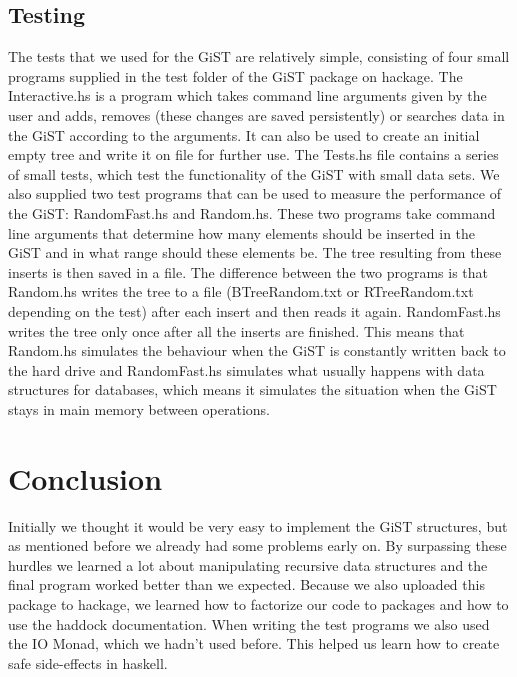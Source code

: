 \documentclass{scrartcl}
\begin{document}
\subsection{Testing}
The tests that we used for the GiST are relatively simple, consisting of four small programs supplied in the test folder of the GiST package on hackage. The Interactive.hs is a program which takes command line arguments
given by the user and adds, removes (these changes are saved persistently) or searches data in the GiST according to the arguments. It can also be used to create an initial empty tree and write it on file for further use.
The Tests.hs file contains a series of small tests, which test the functionality of the GiST with small data sets. We also supplied two test programs that can be used to measure the performance of the GiST: RandomFast.hs 
and Random.hs. These two programs take command line arguments that determine how many elements should be inserted in the GiST and in what range should these elements be. The tree resulting from these inserts is then
saved in a file. The difference between the two programs is that Random.hs writes the tree to a file (BTreeRandom.txt or RTreeRandom.txt depending on the test) after each insert and then reads it again. RandomFast.hs 
writes the tree only once after all the inserts are finished. This means that Random.hs simulates the behaviour when the GiST is constantly written back to the hard drive and RandomFast.hs simulates what usually happens 
with data structures for databases, which means it simulates the situation when the GiST stays in main memory between operations.

\section{Conclusion}

Initially we thought it would be very easy to implement the GiST structures, but as mentioned before we already had some problems early on. By surpassing 
these hurdles we learned a lot about manipulating recursive data structures and the final program worked better than we expected. Because we also uploaded
this package to hackage, we learned how to factorize our code to packages and how to use the haddock documentation. When writing the test programs we also used the IO Monad,
which we hadn't used before. This helped us learn how to create safe side-effects in haskell. 

 

\end{document}
